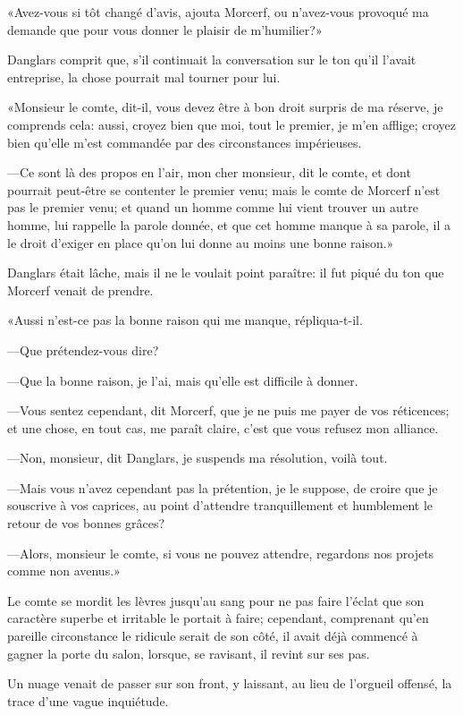 «Avez-vous si tôt changé d'avis, ajouta Morcerf, ou n'avez-vous provoqué ma demande que pour vous donner le plaisir de m'humilier?» 

Danglars comprit que, s'il continuait la conversation sur le ton qu'il l'avait entreprise, la chose pourrait mal tourner pour lui. 

«Monsieur le comte, dit-il, vous devez être à bon droit surpris de ma réserve, je comprends cela: aussi, croyez bien que moi, tout le premier, je m'en afflige; croyez bien qu'elle m'est commandée par des circonstances impérieuses. 

—Ce sont là des propos en l'air, mon cher monsieur, dit le comte, et dont pourrait peut-être se contenter le premier venu; mais le comte de Morcerf n'est pas le premier venu; et quand un homme comme lui vient trouver un autre homme, lui rappelle la parole donnée, et que cet homme manque à sa parole, il a le droit d'exiger en place qu'on lui donne au moins une bonne raison.» 

Danglars était lâche, mais il ne le voulait point paraître: il fut piqué du ton que Morcerf venait de prendre. 

«Aussi n'est-ce pas la bonne raison qui me manque, répliqua-t-il. 

—Que prétendez-vous dire? 

—Que la bonne raison, je l'ai, mais qu'elle est difficile à donner. 

—Vous sentez cependant, dit Morcerf, que je ne puis me payer de vos réticences; et une chose, en tout cas, me paraît claire, c'est que vous refusez mon alliance. 

—Non, monsieur, dit Danglars, je suspends ma résolution, voilà tout. 

—Mais vous n'avez cependant pas la prétention, je le suppose, de croire que je souscrive à vos caprices, au point d'attendre tranquillement et humblement le retour de vos bonnes grâces? 

—Alors, monsieur le comte, si vous ne pouvez attendre, regardons nos projets comme non avenus.» 

Le comte se mordit les lèvres jusqu'au sang pour ne pas faire l'éclat que son caractère superbe et irritable le portait à faire; cependant, comprenant qu'en pareille circonstance le ridicule serait de son côté, il avait déjà commencé à gagner la porte du salon, lorsque, se ravisant, il revint sur ses pas. 

Un nuage venait de passer sur son front, y laissant, au lieu de l'orgueil offensé, la trace d'une vague inquiétude. 

